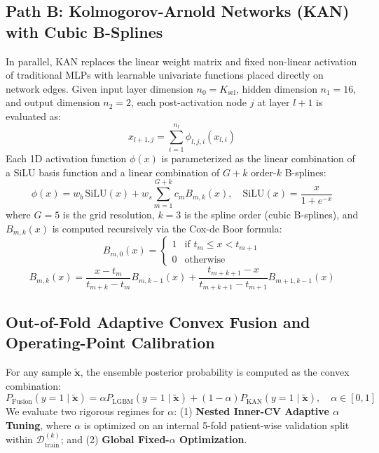 \documentclass[journal,10pt,twoside]{IEEEtran}
\begin{document}
\subsection{Path B: Kolmogorov-Arnold Networks (KAN) with Cubic B-Splines}
In parallel, KAN \cite{ref7} replaces the linear weight matrix and fixed non-linear activation of traditional MLPs with learnable univariate functions placed directly on network edges. Given input layer dimension $n_0 = K_{\text{sel}}$, hidden dimension $n_1 = 16$, and output dimension $n_2 = 2$, each post-activation node $j$ at layer $l+1$ is evaluated as:
\begin{equation}
x_{l+1, j} = \sum_{i=1}^{n_l} \phi_{l,j,i}(x_{l,i})
\end{equation}
Each 1D activation function $\phi(x)$ is parameterized as the linear combination of a SiLU basis function and a linear combination of $G + k$ order-$k$ B-splines:
\begin{equation}
\phi(x) = w_b \, \text{SiLU}(x) + w_s \sum_{m=1}^{G+k} c_m B_{m,k}(x), \quad \text{SiLU}(x) = \frac{x}{1 + e^{-x}}
\end{equation}
where $G = 5$ is the grid resolution, $k = 3$ is the spline order (cubic B-splines), and $B_{m,k}(x)$ is computed recursively via the Cox-de Boor formula:
\begin{equation}
B_{m, 0}(x) = \begin{cases} 1 & \text{if } t_m \le x < t_{m+1} \\ 0 & \text{otherwise} \end{cases}
\end{equation}
\begin{equation}
B_{m, k}(x) = \frac{x - t_m}{t_{m+k} - t_m} B_{m, k-1}(x) + \frac{t_{m+k+1} - x}{t_{m+k+1} - t_{m+1}} B_{m+1, k-1}(x)
\end{equation}

\subsection{Out-of-Fold Adaptive Convex Fusion and Operating-Point Calibration}
For any sample $\tilde{\mathbf{x}}$, the ensemble posterior probability is computed as the convex combination:
\begin{equation}
P_{\text{Fusion}}(y=1 \mid \tilde{\mathbf{x}}) = \alpha P_{\text{LGBM}}(y=1 \mid \tilde{\mathbf{x}}) + (1 - \alpha) P_{\text{KAN}}(y=1 \mid \tilde{\mathbf{x}}), \quad \alpha \in [0, 1]
\end{equation}
We evaluate two rigorous regimes for $\alpha$: (1) \textbf{Nested Inner-CV Adaptive $\alpha$ Tuning}, where $\alpha$ is optimized on an internal 5-fold patient-wise validation split within $\mathcal{D}_{\text{train}}^{(k)}$; and (2) \textbf{Global Fixed-$\alpha$ Optimization}.
\end{document}
